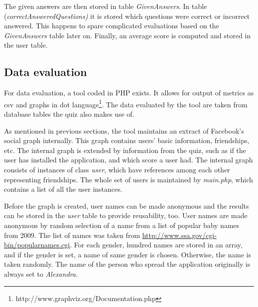 \documentclass[preprint,12pt]{elsarticle}
\begin{document}
The given answers are then stored in table \textit{GivenAnswers}. In
table (\textit{correctAnsweredQuestions)} it is stored which questions
were correct or incorrect answered. This happens to spare complicated
evaluations based on the \textit{GivenAnswers} table later on.
Finally, an average score is computed and stored in the user table.



\subsection{Data evaluation}
\label{sec:data-evaluation}
For data evaluation, a tool coded in PHP exists. It allows for output
of metrics as \ac{csv} and graphs in \ac{dot}
language\footnote{http://www.graphviz.org/Documentation.php}.
The data evaluated by the tool are taken from
 database tables the quiz also makes use of.

As mentioned in previous sections, the tool maintains an extract of
Facebook's social graph internally. This graph contains users' basic
information, friendships, etc. The internal graph is
extended by information from the quiz, such as if the user has
installed the application, and which score a user had. The internal graph
consists of instances of class \textit{user}, which have references
among each other representing friendships. The whole set of users is
maintained by \textit{main.php}, which contains a list of all the user
instances. 

Before the graph is created, user names can be made anonymous and the
results can be stored in the \textit{user} table to provide
reusability, too. User names are made anonymous by random selection of
a name from a list of popular baby names from 2009. The list of names was
taken from \url{http://www.ssa.gov/cgi-bin/popularnames.cgi}.   
For each gender, hundred names are stored in an array, and if the
gender is set, a name of same gender is chosen. Otherwise, the name is
taken randomly. The name of the person who spread the application
originally is always set to \textit{Alexandra}.
\end{document}
